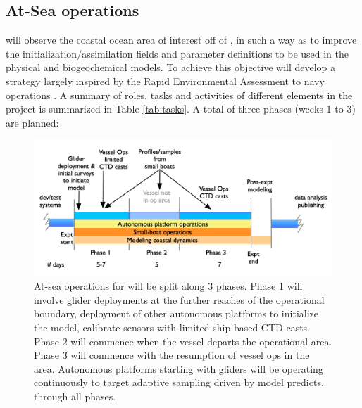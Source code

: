   
\subsection{At-Sea operations}

\proj will observe the coastal ocean area of interest off of \naze, in
such a way as to improve the initialization/assimilation fields and
parameter definitions to be used in the physical and biogeochemical
models. To achieve this objective \proj will develop a strategy largely
inspired by the Rapid Environmental Assessment to navy operations
. A summary of roles, tasks and activities of different
elements in the project is summarized in Table \ref{tab:tasks}. A total
of three phases (weeks 1 to 3) are planned:


\begin{figure}[!t]
  \vspace{-0.5cm}
  \centering
  \includegraphics[scale=0.25]{fig/timelines.jpg}
  \caption{At-sea operations for \proj will be split along 3 phases.
    Phase 1 will involve glider deployments at the further reaches of
    the operational boundary, deployment of other autonomous platforms
    to initialize the model, calibrate sensors with limited ship based
    CTD casts. Phase 2 will commence when the vessel departs the \naz
    operational area. Phase 3 will commence with the resumption of
    vessel ops in the \naz area. Autonomous platforms starting with
    gliders will be operating continuously to target adaptive sampling
    driven by model predicts, through all phases.}
  \vspace{-0.3cm}
 \label{fig:expt-phases}
\end{figure}

 
